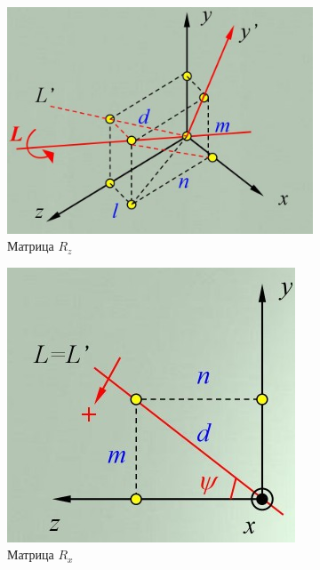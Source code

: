 \documentclass[a4paper, 14pt]{extarticle}
\begin{document}
\begin{figure}[h]
	\centering
	\begin{subfigure}[b]{0.3\textwidth}
		\centering
		\includegraphics[width=\textwidth]{l4/S017.jpg}
		\caption{Матрица $R_z$}
	\end{subfigure}
	\begin{subfigure}[b]{0.3\textwidth}
		\centering
		\includegraphics[width=\textwidth]{l4/S018.jpg}
		\caption{Матрица $R_x$}
	\end{subfigure}
	\begin{subfigure}[b]{0.3\textwidth}

\end{subfigure}
\end{figure}
\end{document}
